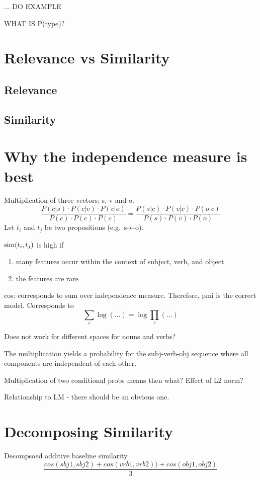 ...
DO EXAMPLE


WHAT IS P(type)?

\section{Relevance vs Similarity}

\subsection{Relevance}

\subsection{Similarity}

\section{Why the independence measure is best}

Multiplication of three vectors: s, v and o.
\[
\frac{
P(c|s) \cdot P(c|v) \cdot P(c|o)}{
P(c) \cdot P(c) \cdot P(c)} =
\frac{
P(s|c) \cdot P(v|c) \cdot P(o|c)
}{
P(s) \cdot P(v) \cdot P(o)
}
\]
Let $t_i$ and $t_j$ be two propositions
(e.g.~s-v-o).

$\textmd{sim}(t_i,t_j)$ is high if
\begin{enumerate}
\item many features occur within the context of subject, verb, and object
\item the features are rare
\end{enumerate}

cos: corresponds to sum over independence measure.
Therefore, pmi is the correct model.
Corresponds to
\[
\sum_c \log(...) = \log \prod_c(...)
\]



Does not work for different
spaces for nouns and verbs?

The multiplication yields a probability
for the subj-verb-obj sequence where all
components are independent of each other.

Multiplication of two conditional probs means then what?
Effect of L2 norm?


Relationship to LM - there should be an obvious one.


\section{Decomposing Similarity}
Decompsoed additive baseline similarity
\[
\frac{cos(sbj1,sbj2) + cos(vrb1,vrb2)) + cos(obj1,obj2)}{3}
\]


